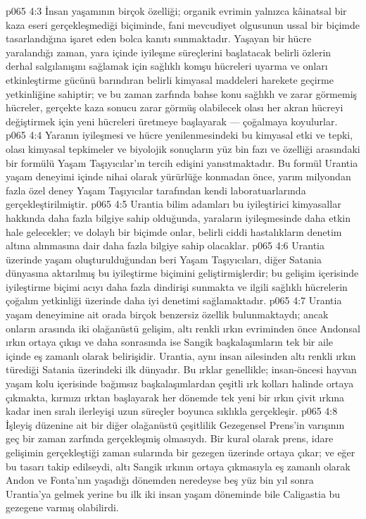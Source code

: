 \vs p065 4:3 İnsan yaşamının birçok özelliği; organik evrimin yalnızca kâinatsal bir kaza eseri gerçekleşmediği biçiminde, fani mevcudiyet olgusunun ussal bir biçimde tasarlandığına işaret eden bolca kanıtı sunmaktadır. Yaşayan bir hücre yaralandığı zaman, yara içinde iyileşme süreçlerini başlatacak belirli özlerin derhal salgılanışını sağlamak için sağlıklı komşu hücreleri uyarma ve onları etkinleştirme gücünü barındıran belirli kimyasal maddeleri harekete geçirme yetkinliğine sahiptir; ve bu zaman zarfında bahse konu sağlıklı ve zarar görmemiş hücreler, gerçekte kaza sonucu zarar görmüş olabilecek olası her akran hücreyi değiştirmek için yeni hücreleri üretmeye başlayarak --- çoğalmaya koyulurlar.
\vs p065 4:4 Yaranın iyileşmesi ve hücre yenilenmesindeki bu kimyasal etki ve tepki, olası kimyasal tepkimeler ve biyolojik sonuçların yüz bin fazı ve özelliği arasındaki bir formülü Yaşam Taşıyıcılar’ın tercih edişini yansıtmaktadır. Bu formül Urantia yaşam deneyimi içinde nihai olarak yürürlüğe konmadan önce, yarım milyondan fazla özel deney Yaşam Taşıyıcılar tarafından kendi laboratuarlarında gerçekleştirilmiştir.
\vs p065 4:5 Urantia bilim adamları bu iyileştirici kimyasallar hakkında daha fazla bilgiye sahip olduğunda, yaraların iyileşmesinde daha etkin hale gelecekler; ve dolaylı bir biçimde onlar, belirli ciddi hastalıkların denetim altına alınmasına dair daha fazla bilgiye sahip olacaklar.
\vs p065 4:6 Urantia üzerinde yaşam oluşturulduğundan beri Yaşam Taşıyıcıları, diğer Satania dünyasına aktarılmış bu iyileştirme biçimini geliştirmişlerdir; bu gelişim içerisinde iyileştirme biçimi acıyı daha fazla dindirişi sunmakta ve ilgili sağlıklı hücrelerin çoğalım yetkinliği üzerinde daha iyi denetimi sağlamaktadır.
\vs p065 4:7 Urantia yaşam deneyimine ait orada birçok benzersiz özellik bulunmaktaydı; ancak onların arasında iki olağanüstü gelişim, altı renkli ırkın evriminden önce Andonsal ırkın ortaya çıkışı ve daha sonrasında ise Sangik başkalaşımların tek bir aile içinde eş zamanlı olarak belirişidir. Urantia, aynı insan ailesinden altı renkli ırkın türediği Satania üzerindeki ilk dünyadır. Bu ırklar genellikle; insan\hyp{}öncesi hayvan yaşam kolu içerisinde bağımsız başkalaşımlardan çeşitli ırk kolları halinde ortaya çıkmakta, kırmızı ırktan başlayarak her dönemde tek yeni bir ırkın çivit ırkına kadar inen sıralı ilerleyişi uzun süreçler boyunca sıklıkla gerçekleşir.
\vs p065 4:8 İşleyiş düzenine ait bir diğer olağanüstü çeşitlilik Gezegensel Prens’in varışının geç bir zaman zarfında gerçekleşmiş olmasıydı. Bir kural olarak prens, idare gelişimin gerçekleştiği zaman sularında bir gezegen üzerinde ortaya çıkar; ve eğer bu tasarı takip edilseydi, altı Sangik ırkının ortaya çıkmasıyla eş zamanlı olarak Andon ve Fonta’nın yaşadığı dönemden neredeyse beş yüz bin yıl sonra Urantia’ya gelmek yerine bu ilk iki insan yaşam döneminde bile Caligastia bu gezegene varmış olabilirdi.
